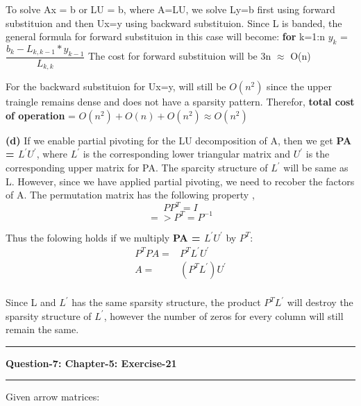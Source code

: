 \documentclass{article}
\newcommand\question[2]{\vspace{.25in}\hrule\textbf{#1: #2}\hrule\vspace{.10in}}
\renewcommand\part[1]{\vspace{.10in}\textbf{(#1)}}
\begin{document}
To solve Ax = b or LU = b, where A=LU, we solve Ly=b first using forward substituion and then Ux=y using backward substituion. Since L is banded, the general formula for forward substituion in this case will become: \newline
\textbf {for} k=1:n \newline
\hspace*{0.5cm} $y_{k}$ = $\dfrac{b_{k} - L_{k,k-1}*y_{k-1}}{L_{k,k}}$ \newline
The cost for forward substituion will be 3n $\approx$ O(n)

For the backward substituion for Ux=y, will still be $O(n^2)$ since the upper traingle remains dense and does not have a sparsity pattern. \newline
Therefor, \textbf {total cost of operation} = $O(n^2) + O(n) + O(n^2) \approx O(n^2)$ \newline


\part{d}
If we enable partial pivoting for the LU decomposition of A, then we get \textbf {PA = $L^\prime U^\prime$}, where $L^\prime$ is the corresponding lower triangular matrix and $U^\prime$ is the corresponding upper matrix for PA. The sparcity structure of $L^\prime$ will be same as L. However, since we have applied partial pivoting, we need to recober the factors of A. The permutation matrix has the following property ,\newline
\[PP^T = I\]
\[=> P^T = P^{-1}\]

Thus the folowing holds if we multiply \textbf {PA = $L^\prime U^\prime$} by $P^T$: \newline
\begin{align*}
P^TPA =& P^TL^\prime U^\prime \\
A =& (P^TL^\prime )U^\prime \\
\end{align*}

Since L and $L^\prime$ has the same sparsity structure, the product $P^TL^\prime$ will destroy the sparsity structure of $L^\prime$, however the number of zeros for every column will still remain the same. \newline



\question{Question-7}{Chapter-5: Exercise-21}
Given arrow matrices: \newline
\end{document}
